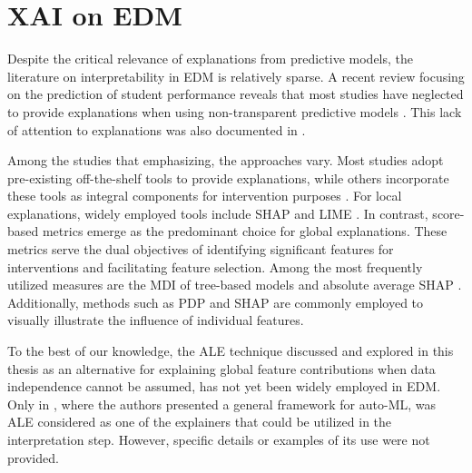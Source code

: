 \section{XAI on EDM}

Despite the critical relevance of explanations from predictive models, the literature on interpretability in \gls{EDM} is relatively sparse. A recent review focusing on the prediction of student performance reveals that most studies have neglected to provide explanations when using non-transparent predictive models \cite{Chitti2020NeedPrediction}. This lack of attention to explanations was also documented in \cite{Livieris2023AnMining}. 

Among the studies that emphasizing, the approaches vary. Most studies adopt pre-existing off-the-shelf tools to provide explanations, while others incorporate these tools as integral components for intervention purposes \cite{Mu2020TowardsStudents, Afzaal2021ExplainableSelf-Regulation}. For local explanations, widely employed tools include \gls{SHAP} \cite{Livieris2023AnMining, Chiu2020GenderHypothesis, Doewes2020StructuralScoring, Oliveira2023TowardsEnglish} and LIME \cite{Livieris2023AnMining, Matetic2019MiningNetworks, Zabriskie2019UsingOutcomes, Hasib2022APerformance, Chen2022Week-WiseIntelligence}. In contrast, score-based metrics emerge as the predominant choice for global explanations. These metrics serve the dual objectives of identifying significant features for interventions and facilitating feature selection. Among the most frequently utilized measures are the \gls{MDI} of tree-based models \cite{Cortez2008UsingPerformance, AshrafATechniques, Zhao2020PredictingData} and absolute average \gls{SHAP} \cite{Hoq2023AnalysisCourse, Rohani2023EarlyMOOC}. Additionally, methods such as \gls{PDP} \cite{Hong2022RandomSchool, Masci2018StudentApproach} and \gls{SHAP} \cite{Chiu2020GenderHypothesis, Hoq2023AnalysisCourse} are commonly employed to visually illustrate the influence of individual features.

To the best of our knowledge, the \gls{ALE} technique discussed and explored in this thesis as an alternative for explaining global feature contributions when data independence cannot be assumed, has not yet been widely employed in \gls{EDM}. Only in \cite{NovilloRangone2022AutomationLearning}, where the authors presented a general framework for auto-ML, was ALE considered as one of the explainers that could be utilized in the interpretation step. However, specific details or examples of its use were not provided.

